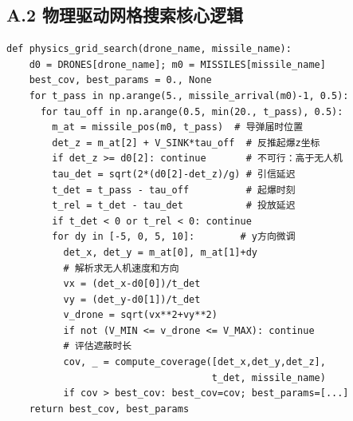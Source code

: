 \documentclass[12pt, a4paper]{article}
\begin{document}
\subsection*{A.2 物理驱动网格搜索核心逻辑}

\begin{verbatim}
def physics_grid_search(drone_name, missile_name):
    d0 = DRONES[drone_name]; m0 = MISSILES[missile_name]
    best_cov, best_params = 0., None
    for t_pass in np.arange(5., missile_arrival(m0)-1, 0.5):
      for tau_off in np.arange(0.5, min(20., t_pass), 0.5):
        m_at = missile_pos(m0, t_pass)  # 导弹届时位置
        det_z = m_at[2] + V_SINK*tau_off  # 反推起爆z坐标
        if det_z >= d0[2]: continue       # 不可行：高于无人机
        tau_det = sqrt(2*(d0[2]-det_z)/g) # 引信延迟
        t_det = t_pass - tau_off          # 起爆时刻
        t_rel = t_det - tau_det           # 投放延迟
        if t_det < 0 or t_rel < 0: continue
        for dy in [-5, 0, 5, 10]:        # y方向微调
          det_x, det_y = m_at[0], m_at[1]+dy
          # 解析求无人机速度和方向
          vx = (det_x-d0[0])/t_det
          vy = (det_y-d0[1])/t_det
          v_drone = sqrt(vx**2+vy**2)
          if not (V_MIN <= v_drone <= V_MAX): continue
          # 评估遮蔽时长
          cov, _ = compute_coverage([det_x,det_y,det_z],
                                    t_det, missile_name)
          if cov > best_cov: best_cov=cov; best_params=[...]
    return best_cov, best_params
\end{verbatim}
\end{document}
